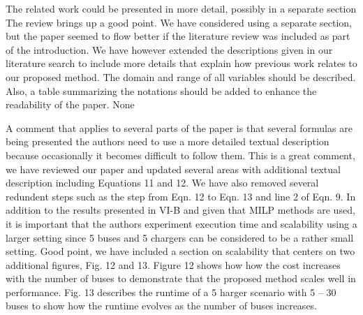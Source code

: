 \documentclass{article}
\begin{document}
\begin{buttkissing}
	\reviewerclaims The related work could be presented in more detail, possibly in a separate section
	\kissbutt The review brings up a good point.  We have considered using a separate section, but the paper seemed to flow better if the literature review was included as part of the introduction. We have however extended the descriptions given in our literature search to include more details that explain how previous work relates to our proposed method.  
	\reviewerclaims The domain and range of all variables should be described. Also, a table summarizing the notations should be added to enhance the readability of the paper.
	\kissbutt None

	\reviewerclaims A comment that applies to several parts of the paper is that several formulas are being presented the authors need to use a more detailed textual description because occasionally it becomes difficult to follow them.
	\kissbutt This is a great comment, we have reviewed our paper and updated several areas with additional textual description including Equations 11 and 12. We have also removed several redundent steps such as the step from Eqn. 12 to Eqn. 13 and line 2 of Eqn. 9.  
	\reviewerclaims In addition to the results presented in VI-B and given that MILP methods are used, it is important that the authors experiment execution time and scalability using a larger setting since 5 buses and 5 chargers can be considered to be a rather small setting.
	\kissbutt Good point, we have included a section on scalability that centers on two additional figures, Fig. 12 and 13. Figure 12 shows how how the cost increases with the number of buses to demonstrate that the proposed method scales well in performance. Fig. 13 describes the runtime of a 5 harger scenario with 5 -- 30 buses to show how the runtime evolves as the number of buses increases.  
\end{buttkissing}
\end{document}
